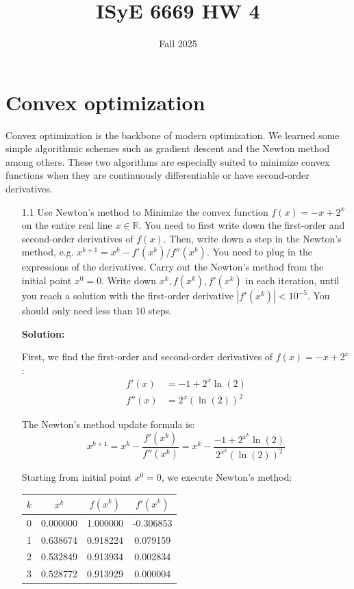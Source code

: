 \documentclass{article}
\title{ISyE 6669 HW 4}
\date{Fall 2025}
\def\R{\mathbb{R}}
\begin{document}
\maketitle


\noindent

\section{Convex optimization}
Convex optimization is the backbone of modern optimization. We learned some simple algorithmic schemes such as gradient descent and the Newton method among others. These two algorithms are especially suited to minimize convex functions when they are continuously differentiable or have second-order derivatives.

\begin{enumerate}
    \item[1.1] Use Newton's method to Minimize the convex function $f(x)=-x+2^x$ on the entire real line $x\in\R$. You need to first write down the first-order and second-order derivatives of $f(x)$. Then, write down a step in the Newton's method, e.g. $x^{k+1} = x^k - f'(x^k)/f''(x^k)$. You need to plug in the expressions of the derivatives. Carry out the Newton's method from the initial point $x^0 = 0$. Write down $x^k, f(x^k), f'(x^k)$ in each iteration, until you reach a solution with the first-order derivative $|f'(x^k)|<10^{-5}$. You should only need less than 10 steps.
    
    \textbf{Solution:}
    
    First, we find the first-order and second-order derivatives of $f(x) = -x + 2^x$:
    \begin{align}
    f'(x) &= -1 + 2^x \ln(2) \\
    f''(x) &= 2^x (\ln(2))^2
    \end{align}
    
    The Newton's method update formula is:
    $$x^{k+1} = x^k - \frac{f'(x^k)}{f''(x^k)} = x^k - \frac{-1 + 2^{x^k} \ln(2)}{2^{x^k} (\ln(2))^2}$$
    
    Starting from initial point $x^0 = 0$, we execute Newton's method:
    
    \begin{center}
    \begin{tabular}{|c|c|c|c|}
    \hline
    $k$ & $x^k$ & $f(x^k)$ & $f'(x^k)$ \\
    \hline
    0 & 0.000000 & 1.000000 & -0.306853 \\
    1 & 0.638674 & 0.918224 & 0.079159 \\
    2 & 0.532849 & 0.913934 & 0.002834 \\
    3 & 0.528772 & 0.913929 & 0.000004 \\
    \hline
    \end{tabular}
    \end{center}
    

\end{enumerate}
\end{document}
